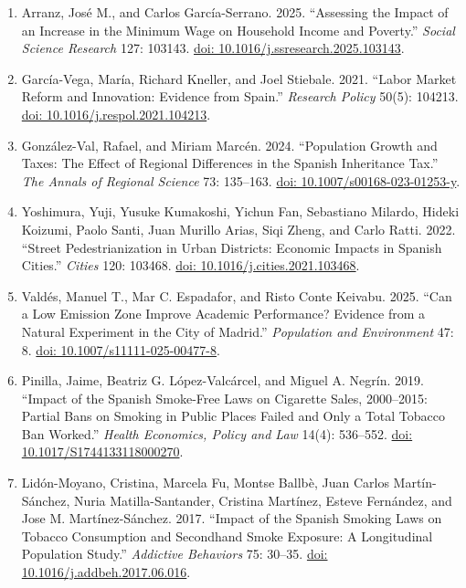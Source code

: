 \documentclass[12pt]{article}
\begin{document}
{\begin{enumerate}[leftmargin=*]
    \item Arranz, Jos\'e M., and Carlos Garc\'ia-Serrano. 2025. ``Assessing the Impact of an Increase in the Minimum Wage on Household Income and Poverty.'' \emph{Social Science Research} 127: 103143. \href{https://doi.org/10.1016/j.ssresearch.2025.103143}{doi: 10.1016/j.ssresearch.2025.103143}.

    \item Garc\'ia-Vega, Mar\'ia, Richard Kneller, and Joel Stiebale. 2021. ``Labor Market Reform and Innovation: Evidence from Spain.'' \emph{Research Policy} 50(5): 104213. \href{https://doi.org/10.1016/j.respol.2021.104213}{doi: 10.1016/j.respol.2021.104213}.

    \item Gonz\'alez-Val, Rafael, and Miriam Marc\'en. 2024. ``Population Growth and Taxes: The Effect of Regional Differences in the Spanish Inheritance Tax.'' \emph{The Annals of Regional Science} 73: 135--163. \href{https://doi.org/10.1007/s00168-023-01253-y}{doi: 10.1007/s00168-023-01253-y}.

    \item Yoshimura, Yuji, Yusuke Kumakoshi, Yichun Fan, Sebastiano Milardo, Hideki Koizumi, Paolo Santi, Juan Murillo Arias, Siqi Zheng, and Carlo Ratti. 2022. ``Street Pedestrianization in Urban Districts: Economic Impacts in Spanish Cities.'' \emph{Cities} 120: 103468. \href{https://doi.org/10.1016/j.cities.2021.103468}{doi: 10.1016/j.cities.2021.103468}.

    \item Vald\'es, Manuel T., Mar C. Espadafor, and Risto Conte Keivabu. 2025. ``Can a Low Emission Zone Improve Academic Performance? Evidence from a Natural Experiment in the City of Madrid.'' \emph{Population and Environment} 47: 8. \href{https://doi.org/10.1007/s11111-025-00477-8}{doi: 10.1007/s11111-025-00477-8}.

    \item Pinilla, Jaime, Beatriz G. L\'opez-Valc\'arcel, and Miguel A. Negr\'in. 2019. ``Impact of the Spanish Smoke-Free Laws on Cigarette Sales, 2000--2015: Partial Bans on Smoking in Public Places Failed and Only a Total Tobacco Ban Worked.'' \emph{Health Economics, Policy and Law} 14(4): 536--552. \href{https://doi.org/10.1017/S1744133118000270}{doi: 10.1017/S1744133118000270}.

    \item Lid\'on-Moyano, Cristina, Marcela Fu, Montse Ballb\`e, Juan Carlos Mart\'in-S\'anchez, Nuria Matilla-Santander, Cristina Mart\'inez, Esteve Fern\'andez, and Jose M. Mart\'inez-S\'anchez. 2017. ``Impact of the Spanish Smoking Laws on Tobacco Consumption and Secondhand Smoke Exposure: A Longitudinal Population Study.'' \emph{Addictive Behaviors} 75: 30--35. \href{https://doi.org/10.1016/j.addbeh.2017.06.016}{doi: 10.1016/j.addbeh.2017.06.016}.


\end{enumerate}}
\end{document}
